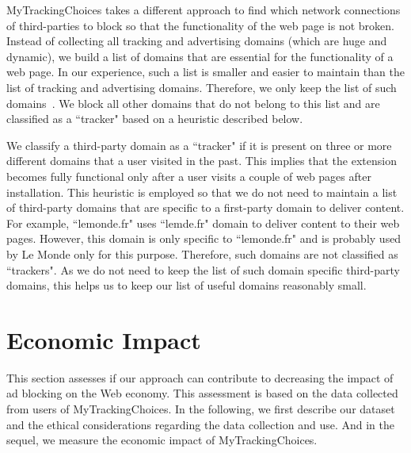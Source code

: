 \documentclass[conference]{IEEEtran}
\begin{document}
MyTrackingChoices takes a different approach to find which network connections of third-parties to block so that the functionality of the web page is not broken.
Instead of collecting all tracking and advertising domains (which are huge and dynamic), we build a list of domains that are essential for the functionality of a web page.
In our experience, such a list is smaller and easier to maintain than the list of tracking and advertising domains.
Therefore, we only keep the list of such domains~\cite{list_allowed_domains}.
We block all other domains that do not belong to this list and are classified as a ``tracker" based on a heuristic described below.

We classify a third-party domain as a ``tracker" if it is present on three or more different domains that a user visited in the past. 
This implies that the extension becomes fully functional only after a user visits a couple of web pages after installation.
This heuristic is employed so that we do not need to maintain a list of third-party domains that are specific to a first-party domain to deliver content.
For example, ``lemonde.fr" uses ``lemde.fr" domain to deliver content to their web pages. 
However, this domain is only specific to ``lemonde.fr" and is probably used by Le Monde only for this purpose.
Therefore, such domains are not classified as ``trackers".
As we do not need to keep the list of such domain specific third-party domains, this helps us to keep our list of useful domains reasonably small.




















 


















\section{Economic Impact}
\label{sec:economic_impact}
This section assesses if our approach can contribute to decreasing the impact of ad blocking on the Web economy.
This assessment is based on the data collected from users of MyTrackingChoices.
In the following, we first describe our dataset and the ethical considerations regarding the data collection and use.
And in the sequel, we measure the economic impact of MyTrackingChoices.
\end{document}
